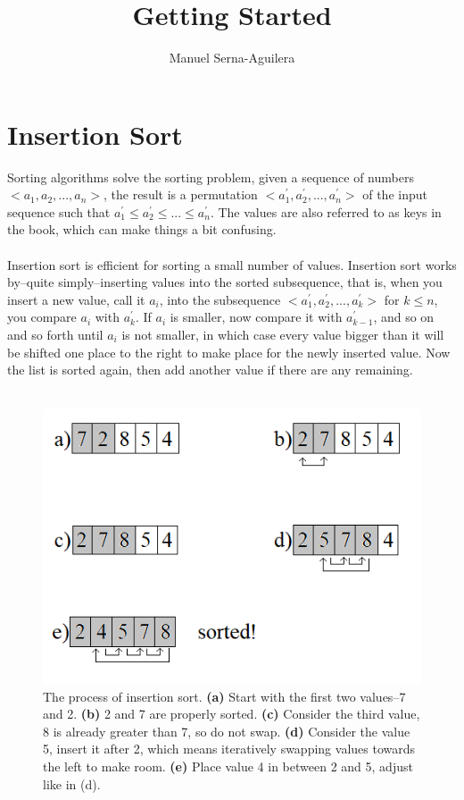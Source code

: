\documentclass{article}
\title{Getting Started}
\author{Manuel Serna-Aguilera}
\date{}
\begin{document}
\maketitle

\section*{Insertion Sort}
Sorting algorithms solve the sorting problem, given a sequence of numbers\\
$<a_1, a_2, ..., a_n>$, the result is a permutation $<a_1^{'}, a_2^{'}, ..., a_n^{'}>$ of the input sequence such that $a_1^{'} \leq a_2^{'} \leq ...\leq a_n^{'}$. The values are also referred to as keys in the book, which can make things a bit confusing.
\\ \\
Insertion sort is efficient for sorting a small number of values. Insertion sort works by--quite simply--inserting values into the sorted subsequence, that is, when you insert a new value, call it $a_i$, into the subsequence $<a_1^{'}, a_2^{'}, ..., a_k^{'}>$ for $k \leq n$, you compare $a_i$ with $a_k^{'}$. If $a_i$ is smaller, now compare it with $a_{k-1}^{'}$, and so on and so forth until $a_i$ is not smaller, in which case every value bigger than it will be shifted one place to the right to make place for the newly inserted value. Now the list is sorted again, then add another value if there are any remaining.
\\ \\
\begin{figure}[ht]
\centering
\includegraphics[scale=0.5]{insertion_sort}
\caption{
The process of insertion sort. \textbf{(a)} Start with the first two values--7 and 2. \textbf{(b)} 2 and 7 are properly sorted. \textbf{(c)} Consider the third value, 8 is already greater than 7, so do not swap. \textbf{(d)} Consider the value 5, insert it after 2, which means iteratively swapping values towards the left to make room. \textbf{(e)} Place value 4 in between 2 and 5, adjust like in (d).
}
\label{fig:insertion_sort}
\end{figure}
\end{document}
